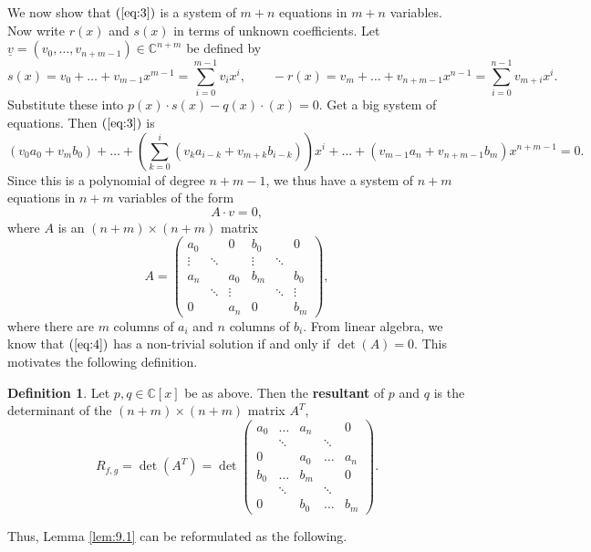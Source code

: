 \documentclass{article}
\newcommand{\C}{\mathbb{C}}
\newcommand{\rb}[1]{\left( #1 \right)}
\renewcommand{\sb}[1]{\left[ #1 \right]}
\theoremstyle{definition}\newtheorem{definition}{Definition}[section]
\theoremstyle{definition}\newtheorem{notation}[definition]{Notation}
\theoremstyle{definition}\newtheorem{remark}[definition]{Remark}
\theoremstyle{definition}\newtheorem{example}[definition]{Example}
\theoremstyle{definition}\newtheorem{fact}{Fact}
\theoremstyle{definition}\newtheorem{exercise}{Exercise}
\begin{document}
We now show that $ \rb{\ref{eq:3}} $ is a system of $ m + n $ equations in $ m + n $ variables. Now write $ r\rb{x} $ and $ s\rb{x} $ in terms of unknown coefficients. Let $ \underline{v} = \rb{v_0, \dots, v_{n + m - 1}} \in \C^{n + m} $ be defined by
$$ s\rb{x} = v_0 + \dots + v_{m - 1}x^{m - 1} = \sum_{i = 0}^{m - 1} v_ix^i, \qquad -r\rb{x} = v_m + \dots + v_{n + m - 1}x^{n - 1} = \sum_{i = 0}^{n - 1} v_{m + i}x^i. $$
Substitute these into $ p\rb{x} \cdot s\rb{x} - q\rb{x} \cdot \rb{x} = 0 $. Get a big system of equations. Then $ \rb{\ref{eq:3}} $ is
$$ \rb{v_0a_0 + v_mb_0} + \dots + \rb{\sum_{k = 0}^i \rb{v_ka_{i - k} + v_{m + k}b_{i - k}}}x^i + \dots + \rb{v_{m - 1}a_n + v_{n + m - 1}b_m}x^{n + m - 1} = 0. $$
Since this is a polynomial of degree $ n + m - 1 $, we thus have a system of $ n + m $ equations in $ n + m $ variables of the form
\begin{equation}
\label{eq:4}
A \cdot v = 0,
\end{equation}
where $ A $ is an $ \rb{n + m} \times \rb{n + m} $ matrix
$$ A = \begin{pmatrix} a_0 & & 0 & b_0 & & 0 \\ \vdots & \ddots & & \vdots & \ddots & \\ a_n & & a_0 & b_m & & b_0 \\ & \ddots & \vdots & & \ddots & \vdots \\ 0 & & a_n & 0 & & b_m \end{pmatrix}, $$
where there are $ m $ columns of $ a_i $ and $ n $ columns of $ b_i $. From linear algebra, we know that $ \rb{\ref{eq:4}} $ has a non-trivial solution if and only if $ \det\rb{A} = 0 $. This motivates the following definition.

\begin{definition}
Let $ p, q \in \C\sb{x} $ be as above. Then the \textbf{resultant} of $ p $ and $ q $ is the determinant of the $ \rb{n + m} \times \rb{n + m} $ matrix $ A^T $,
$$ R_{f, g} = \det\rb{A^T} = \det\begin{pmatrix} a_0 & \dots & a_n & & 0 \\ & \ddots & & \ddots & \\ 0 & & a_0 & \dots & a_n \\ b_0 & \dots & b_m & & 0 \\ & \ddots & & \ddots & \\ 0 & & b_0 & \dots & b_m \end{pmatrix}. $$
\end{definition}

Thus, Lemma \ref{lem:9.1} can be reformulated as the following.
\end{document}
